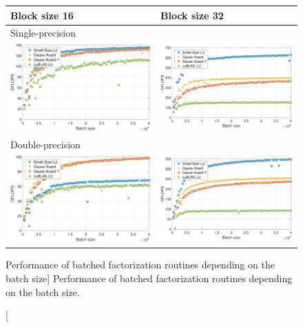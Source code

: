 \begin{figure}[t]
\begin{center}
\begin{tabular}{ll}
Block size 16 & Block size 32\\
\hline
Single-precision\\
\includegraphics[width=.45\columnwidth]{plots/sgebjp_setup__lu_gje_gh_16.pdf}
&
\includegraphics[width=.45\columnwidth]{plots/sgebjp_setup__lu_gje_gh_32.pdf}\\
\hline
Double-precision\\
\includegraphics[width=.45\columnwidth]{plots/dgebjp_setup__lu_gje_gh_16.pdf}
&
\includegraphics[width=.45\columnwidth]{plots/dgebjp_setup__lu_gje_gh_32.pdf}
\end{tabular}
\end{center}
\caption
[Performance of batched factorization routines depending on the batch size]
{%
Performance of batched factorization routines depending on the batch size.}
\label{2017-lu-block-jacobi:fig:performance}
\end{figure}


